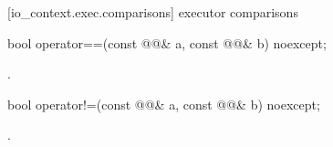 [io_context.exec.comparisons]{ executor comparisons}

%
\begin{itemdecl}
bool operator==(const @@& a, const @@& b) noexcept;
\end{itemdecl}

\begin{itemdescr}
\pnum
\returns {}.
\end{itemdescr}

%
\begin{itemdecl}
bool operator!=(const @@& a, const @@& b) noexcept;
\end{itemdecl}

\begin{itemdescr}
\pnum
\returns {}.
\end{itemdescr}




